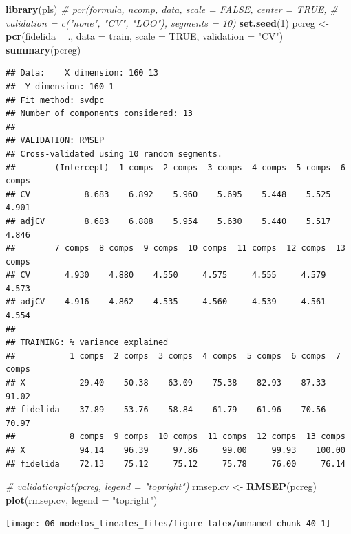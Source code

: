\documentclass[
]{book}
\newenvironment{Shaded}{\begin{snugshade}}{\end{snugshade}}
\newcommand{\CommentTok}[1]{\textcolor[rgb]{0.56,0.35,0.01}{\textit{#1}}}
\newcommand{\DataTypeTok}[1]{\textcolor[rgb]{0.13,0.29,0.53}{#1}}
\newcommand{\DecValTok}[1]{\textcolor[rgb]{0.00,0.00,0.81}{#1}}
\newcommand{\KeywordTok}[1]{\textcolor[rgb]{0.13,0.29,0.53}{\textbf{#1}}}
\newcommand{\NormalTok}[1]{#1}
\newcommand{\OperatorTok}[1]{\textcolor[rgb]{0.81,0.36,0.00}{\textbf{#1}}}
\newcommand{\OtherTok}[1]{\textcolor[rgb]{0.56,0.35,0.01}{#1}}
\newcommand{\StringTok}[1]{\textcolor[rgb]{0.31,0.60,0.02}{#1}}
\theoremstyle{break}
\theoremstyle{definition}
\theoremstyle{definition}
\theoremstyle{definition}
\theoremstyle{remark}
\begin{document}
\begin{Shaded}
\begin{Highlighting}[]
\KeywordTok{library}\NormalTok{(pls)}
\CommentTok{# pcr(formula, ncomp, data, scale = FALSE, center = TRUE, }
\CommentTok{#     validation = c("none", "CV", "LOO"), segments = 10)}
\KeywordTok{set.seed}\NormalTok{(}\DecValTok{1}\NormalTok{)}
\NormalTok{pcreg <-}\StringTok{ }\KeywordTok{pcr}\NormalTok{(fidelida }\OperatorTok{~}\StringTok{ }\NormalTok{., }\DataTypeTok{data =}\NormalTok{ train, }\DataTypeTok{scale =} \OtherTok{TRUE}\NormalTok{, }\DataTypeTok{validation =} \StringTok{"CV"}\NormalTok{)}
\KeywordTok{summary}\NormalTok{(pcreg)}
\end{Highlighting}
\end{Shaded}

\begin{verbatim}
## Data:    X dimension: 160 13 
##  Y dimension: 160 1
## Fit method: svdpc
## Number of components considered: 13
## 
## VALIDATION: RMSEP
## Cross-validated using 10 random segments.
##        (Intercept)  1 comps  2 comps  3 comps  4 comps  5 comps  6 comps
## CV           8.683    6.892    5.960    5.695    5.448    5.525    4.901
## adjCV        8.683    6.888    5.954    5.630    5.440    5.517    4.846
##        7 comps  8 comps  9 comps  10 comps  11 comps  12 comps  13 comps
## CV       4.930    4.880    4.550     4.575     4.555     4.579     4.573
## adjCV    4.916    4.862    4.535     4.560     4.539     4.561     4.554
## 
## TRAINING: % variance explained
##           1 comps  2 comps  3 comps  4 comps  5 comps  6 comps  7 comps
## X           29.40    50.38    63.09    75.38    82.93    87.33    91.02
## fidelida    37.89    53.76    58.84    61.79    61.96    70.56    70.97
##           8 comps  9 comps  10 comps  11 comps  12 comps  13 comps
## X           94.14    96.39     97.86     99.00     99.93    100.00
## fidelida    72.13    75.12     75.12     75.78     76.00     76.14
\end{verbatim}

\begin{Shaded}
\begin{Highlighting}[]
\CommentTok{# validationplot(pcreg, legend = "topright") }
\NormalTok{rmsep.cv <-}\StringTok{ }\KeywordTok{RMSEP}\NormalTok{(pcreg)}
\KeywordTok{plot}\NormalTok{(rmsep.cv, }\DataTypeTok{legend =} \StringTok{"topright"}\NormalTok{)}
\end{Highlighting}
\end{Shaded}

\begin{center}\texttt{[image: 06-modelos\_lineales\_files/figure-latex/unnamed-chunk-40-1]} \end{center}
\end{document}
